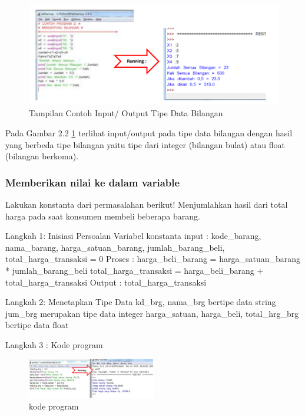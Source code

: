 \begin{figure}[ht]
    \centerline{\includegraphics[width=1\textwidth]{figures/tipedatabilangan.png}}
    \caption{Tampilan Contoh Input/ Output Tipe Data Bilangan}
    \label{tipedatabilangan}
    \end{figure}

Pada Gambar 2.2 \ref{tipedatabilangan} terlihat input/output pada tipe data bilangan dengan hasil yang berbeda tipe bilangan yaitu tipe dari integer (bilangan bulat) atau float (bilangan berkoma).\cite{irfani2016bahan}

\subsubsection{Memberikan nilai ke dalam variable}
Lakukan konstanta dari permasalahan berikut! Menjumlahkan hasil dari total harga pada saat konsumen membeli beberapa barang.

Langkah 1: Inisiasi Persoalan 
Variabel konstanta input :  
kode\_barang, nama\_barang, harga\_satuan\_barang, 
jumlah\_barang\_beli, total\_harga\_transaksi = 0 
Proses :  harga\_beli\_barang = harga\_satuan\_barang * jumlah\_barang\_beli 
total\_harga\_transaksi = harga\_beli\_barang + total\_harga\_transaksi
Output :  total\_harga\_transaksi

Langkah 2: Menetapkan Tipe Data 
kd\_brg, nama\_brg bertipe data string 
jum\_brg merupakan tipe data integer harga\_satuan, harga\_beli, total\_hrg\_brg bertipe data float 

Langkah 3 : Kode program
\begin{figure}[ht]
    \centerline{\includegraphics[width=0.50\textwidth]{figures/code.png}}
    \caption{kode program}
    \label{code}
    \end{figure}
  
